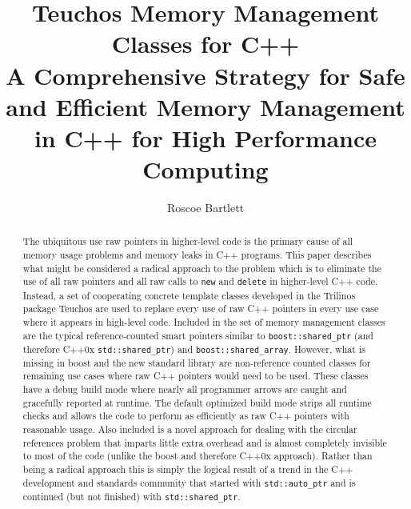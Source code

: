 \documentclass[pdf,ps2pdf,11pt]{SANDreport}
\title{\center
Teuchos Memory Management Classes for C++ \\[2ex] A Comprehensive
Strategy for Safe and Efficient Memory Management in C++ for High
Performance Computing }
\author{
Roscoe Bartlett
}
\date{}
\begin{document}
\maketitle


%


%
\begin{abstract}
%


The ubiquitous use raw pointers in higher-level code is the primary
cause of all memory usage problems and memory leaks in C++
programs. This paper describes what might be considered a radical
approach to the problem which is to eliminate the use of all raw
pointers and all raw calls to {}\texttt{new} and {}\texttt{delete} in
higher-level C++ code.  Instead, a set of cooperating concrete
template classes developed in the Trilinos package Teuchos are used to
replace every use of raw C++ pointers in every use case where it
appears in high-level code.  Included in the set of memory management
classes are the typical reference-counted smart pointers similar to
{}\texttt{boost::shared\_ptr} (and therefore C++0x
{}\texttt{std::shared\_ptr}) and {}\texttt{boost::shared\_array}.
However, what is missing in boost and the new standard library are
non-reference counted classes for remaining use cases where raw C++
pointers would need to be used.  These classes have a debug build mode
where nearly all programmer arrows are caught and gracefully reported
at runtime.  The default optimized build mode strips all runtime
checks and allows the code to perform as efficiently as raw C++
pointers with reasonable usage.  Also included is a novel approach for
dealing with the circular references problem that imparts little extra
overhead and is almost completely invisible to most of the code
(unlike the boost and therefore C++0x approach).  Rather than being a
radical approach this is simply the logical result of a trend in the
C++ development and standards community that started with
{}\texttt{std::auto\_ptr} and is continued (but not finished) with
{}\texttt{std::shared\_ptr}.

%
\end{abstract}
%

%
%
%
\end{document}
